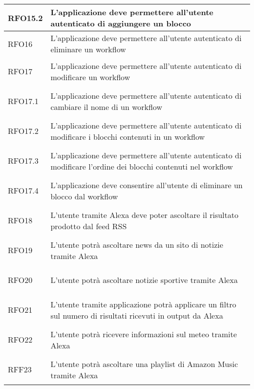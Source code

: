 \begin{longtable}{|>{\centering}m{5em}|m{25em}|}
	\hypertarget{RFO15.2}{RFO15.2} & L'applicazione deve permettere all'utente autenticato di aggiungere un blocco\\ \hline
	
	\hypertarget{RFO16}{RFO16} & L'applicazione deve permettere all'utente autenticato di eliminare un workflow\\ \hline
	
	\hypertarget{RFO17}{RFO17} & L'applicazione deve permettere all'utente autenticato di modificare un workflow\\ \hline
	
	\hypertarget{RFO17.1}{RFO17.1} & L'applicazione deve permettere all'utente autenticato di cambiare il nome di un workflow\\ \hline
	
	\hypertarget{RFO17.2}{RFO17.2} & L'applicazione deve permettere all'utente autenticato di modificare i blocchi contenuti in un workflow\\ \hline
	
	\hypertarget{RFO17.3}{RFO17.3} & L'applicazione deve permettere all'utente autenticato di modificare l'ordine dei blocchi contenuti nel workflow\\ \hline
	
	\hypertarget{RFO17.4}{RFO17.4} & L'applicazione deve consentire all'utente di eliminare un blocco dal workflow\\ \hline
	
	\hypertarget{RFO18}{RFO18} & L'utente tramite Alexa deve poter ascoltare il risultato prodotto dal feed RSS\\ \hline
	
	\hypertarget{RFO19}{RFO19} & L'utente potrà ascoltare news da un sito di notizie tramite Alexa\\ \hline
	
	\hypertarget{RFO20}{RFO20} & L'utente potrà ascoltare notizie sportive tramite Alexa\\ \hline
	
	\hypertarget{RFO21}{RFO21} & L'utente tramite applicazione potrà applicare un filtro sul numero di risultati ricevuti in output da Alexa\\ \hline
	
	\hypertarget{RFO22}{RFO22} & L'utente potrà ricevere informazioni sul meteo tramite Alexa\\ \hline
	
	\hypertarget{RFF23}{RFF23} & L'utente potrà ascoltare una playlist di Amazon Music tramite Alexa\\ \hline
	

\end{longtable}
